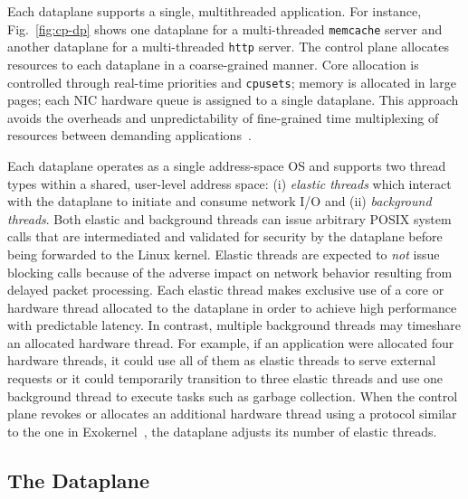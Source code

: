 Each \ix dataplane supports a single, multithreaded application. For
instance, Fig.~\ref{fig:cp-dp} shows one dataplane for a
multi-threaded \texttt{memcache} server and another dataplane for a
multi-threaded \texttt{http} server. The control plane allocates
resources to each dataplane in a coarse-grained manner. Core
allocation is controlled through real-time priorities and
\texttt{cpusets}; memory is allocated in large pages; each NIC
hardware queue is assigned to a single dataplane. This approach avoids
the overheads and unpredictability of fine-grained time multiplexing
of resources between demanding
applications~\cite{DBLP:conf/eurosys/LeverichK14}.

Each \ix dataplane operates as a single address-space OS and supports
two thread types within a shared, user-level address space: (i)
\emph{elastic threads} which interact with the \ix dataplane to
initiate and consume network I/O and (ii) \emph{background threads}.
Both elastic and background threads can issue arbitrary POSIX system
calls that are intermediated and validated for security by the
dataplane before being forwarded to the Linux kernel. Elastic threads
are expected to \emph{not} issue blocking calls because of the adverse
impact on network behavior resulting from delayed packet processing.
Each elastic
thread makes exclusive use of a core or hardware thread allocated to
the dataplane in order to achieve high performance with predictable
latency. In contrast, multiple background threads may timeshare an
allocated hardware thread. For example, if an application were
allocated four hardware threads, it could use all of them as elastic
threads to serve external requests or it could temporarily transition
to three elastic threads and use one background thread to execute
tasks such as garbage collection. When the control plane revokes or
allocates an additional hardware thread using a protocol similar to
the one in Exokernel~\cite{DBLP:conf/sosp/EnglerKO95}, the dataplane
adjusts its number of elastic threads.



\subsection{The \ix Dataplane}
\label{sec:impl:dpkernel}

